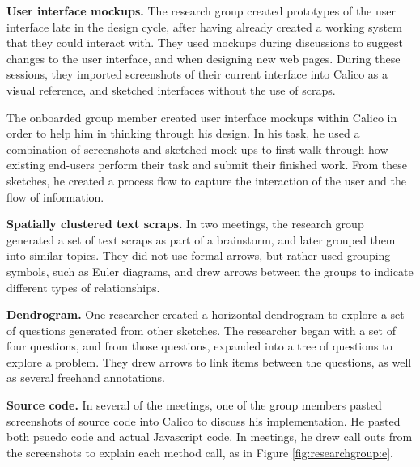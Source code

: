 \textbf{User interface mockups. } The research group created prototypes of the user interface late in the design cycle, after having already created a working system that they could interact with. They used mockups during discussions to suggest changes to the user interface, and when designing new web pages. During these sessions, they imported screenshots of their current interface into Calico as a visual reference, and sketched interfaces without the use of scraps.

The onboarded group member created user interface mockups within Calico in order to help him in thinking through his design. In his task, he used a combination of screenshots and sketched mock-ups to first walk through how existing end-users perform their task and submit their finished work. From these sketches, he created a process flow to capture the interaction of the user and the flow of information.

%


\textbf{Spatially clustered text scraps. } In two meetings, the research group generated a set of text scraps as part of a brainstorm, and later grouped them into similar topics. They did not use formal arrows, but rather used grouping symbols, such as Euler diagrams, and drew arrows between the groups to indicate different types of relationships. 

\textbf{Dendrogram.} One researcher created a horizontal dendrogram to explore a set of questions generated from other sketches. The researcher began with a set of four questions, and from those questions, expanded into a tree of questions to explore a problem. They drew arrows to link items between the questions, as well as several freehand annotations.

\textbf{Source code.} In several of the meetings, one of the group members pasted screenshots of source code into Calico to discuss his implementation. He pasted both psuedo code and actual Javascript code. In meetings, he drew call outs from the screenshots to explain each method call, as in Figure \ref{fig:researchgroup:e}. 

